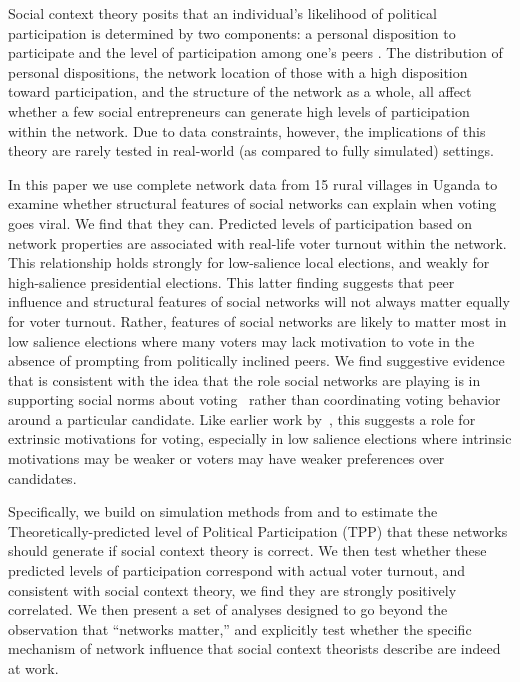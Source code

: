 \documentclass[12pt]{article}
\begin{document}
Social context theory posits that an individual's likelihood of political participation is determined by two components: a personal disposition to participate and the level of participation among one's peers \citep{Fowler:2005ts,Siegel:2009vi,Rolfe:2012ka}. The distribution of personal dispositions, the network location of those with a high disposition toward participation, and the structure of the network as a whole, all affect whether a few social entrepreneurs can generate high levels of participation within the network.  Due to data constraints, however, the implications of this theory are rarely tested in real-world (as compared to fully simulated) settings.

In this paper we use complete network data from 15 rural villages in Uganda to examine whether structural features of social networks can explain when voting goes viral.  We find that they can.  Predicted levels of participation based on network properties are associated with real-life voter turnout within the network. This relationship holds strongly for low-salience local elections, and weakly for high-salience presidential elections. This latter finding suggests that peer influence and structural features of social networks will not always matter equally for voter turnout. Rather, features of social networks are likely to matter most in low salience elections where many voters may lack motivation to vote in the absence of prompting from politically inclined peers. We find suggestive evidence that is consistent with the idea that the role social networks are playing is in supporting social norms about voting~\citep{rosenzweig2019social} rather than coordinating voting behavior around a particular candidate. Like earlier work by~\citet{Gerber:2008fs}, this suggests a role for extrinsic motivations for voting, especially in low salience elections where intrinsic motivations may be weaker or voters may have weaker preferences over candidates.

Specifically, we build on simulation methods from \cite{Siegel:2009vi} and \cite{Rolfe:2012ka} to estimate the Theoretically-predicted level of Political Participation (TPP) that these networks should generate if social context theory is correct. We then test whether these predicted levels of participation correspond with actual voter turnout, %
and consistent with social context theory, we find they are strongly positively correlated. We then present a set of analyses designed to go beyond the observation that ``networks matter,'' and explicitly test whether the specific mechanism of network influence that social context theorists describe are indeed at work.
\end{document}
